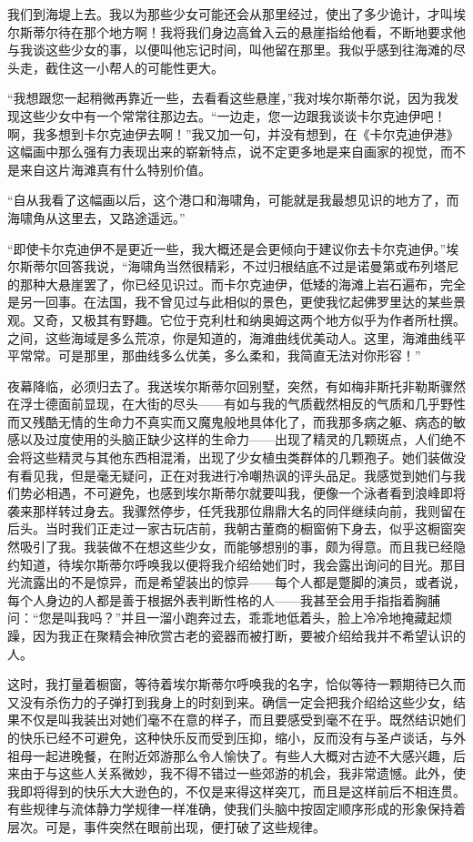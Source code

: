 \par 我们到海堤上去。我以为那些少女可能还会从那里经过，使出了多少诡计，才叫埃尔斯蒂尔待在那个地方啊！我将我们身边高耸入云的悬崖指给他看，不断地要求他与我谈这些少女的事，以便叫他忘记时间，叫他留在那里。我似乎感到往海滩的尽头走，截住这一小帮人的可能性更大。
\par “我想跟您一起稍微再靠近一些，去看看这些悬崖，”我对埃尔斯蒂尔说，因为我发现这些少女中有一个常常往那边去。“一边走，您一边跟我谈谈卡尔克迪伊吧！啊，我多想到卡尔克迪伊去啊！”我又加一句，并没有想到，在《卡尔克迪伊港》这幅画中那么强有力表现出来的崭新特点，说不定更多地是来自画家的视觉，而不是来自这片海滩真有什么特别价值。
\par “自从我看了这幅画以后，这个港口和海啸角，可能就是我最想见识的地方了，而海啸角从这里去，又路途遥远。”
\par “即使卡尔克迪伊不是更近一些，我大概还是会更倾向于建议你去卡尔克迪伊。”埃尔斯蒂尔回答我说，“海啸角当然很精彩，不过归根结底不过是诺曼第或布列塔尼的那种大悬崖罢了，你已经见识过。而卡尔克迪伊，低矮的海滩上岩石遍布，完全是另一回事。在法国，我不曾见过与此相似的景色，更使我忆起佛罗里达的某些景观。又奇，又极其有野趣。它位于克利杜和纳奥姆这两个地方似乎为作者所杜撰。之间，这些海域是多么荒凉，你是知道的，海滩曲线优美动人。这里，海滩曲线平平常常。可是那里，那曲线多么优美，多么柔和，我简直无法对你形容！”
\par 夜幕降临，必须归去了。我送埃尔斯蒂尔回别墅，突然，有如梅非斯托非勒斯骤然在浮士德面前显现，在大街的尽头——有如与我的气质截然相反的气质和几乎野性而又残酷无情的生命力不真实而又魔鬼般地具体化了，而我那多病之躯、病态的敏感以及过度使用的头脑正缺少这样的生命力——出现了精灵的几颗斑点，人们绝不会将这些精灵与其他东西相混淆，出现了少女植虫类群体的几颗孢子。她们装做没有看见我，但是毫无疑问，正在对我进行冷嘲热讽的评头品足。我感觉到她们与我们势必相遇，不可避免，也感到埃尔斯蒂尔就要叫我，便像一个泳者看到浪峰即将袭来那样转过身去。我骤然停步，任凭我那位鼎鼎大名的同伴继续向前，我则留在后头。当时我们正走过一家古玩店前，我朝古董商的橱窗俯下身去，似乎这橱窗突然吸引了我。我装做不在想这些少女，而能够想别的事，颇为得意。而且我已经隐约知道，待埃尔斯蒂尔呼唤我以便将我介绍给她们时，我会露出询问的目光。那目光流露出的不是惊异，而是希望装出的惊异——每个人都是蹩脚的演员，或者说，每个人身边的人都是善于根据外表判断性格的人——我甚至会用手指指着胸脯问：“您是叫我吗？”并且一溜小跑奔过去，乖乖地低着头，脸上冷冷地掩藏起烦躁，因为我正在聚精会神欣赏古老的瓷器而被打断，要被介绍给我并不希望认识的人。
\par 这时，我打量着橱窗，等待着埃尔斯蒂尔呼唤我的名字，恰似等待一颗期待已久而又没有杀伤力的子弹打到我身上的时刻到来。确信一定会把我介绍给这些少女，结果不仅是叫我装出对她们毫不在意的样子，而且要感受到毫不在乎。既然结识她们的快乐已经不可避免，这种快乐反而受到压抑，缩小，反而没有与圣卢谈话，与外祖母一起进晚餐，在附近郊游那么令人愉快了。有些人大概对古迹不大感兴趣，后来由于与这些人关系微妙，我不得不错过一些郊游的机会，我非常遗憾。此外，使我即将得到的快乐大大逊色的，不仅是来得这样突兀，而且是这样前后不相连贯。有些规律与流体静力学规律一样准确，使我们头脑中按固定顺序形成的形象保持着层次。可是，事件突然在眼前出现，便打破了这些规律。
